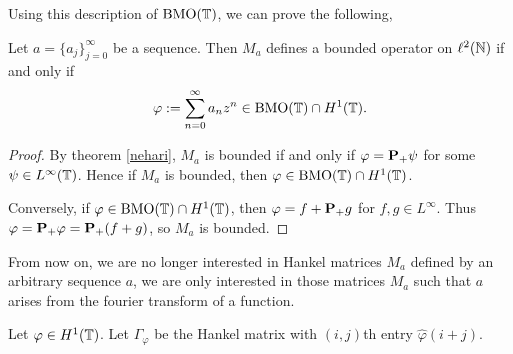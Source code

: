 \documentclass{unswmaths}
\begin{document}
Using this description of $\operatorname{BMO}(\mathbb{T})$, we can prove the following,
\begin{corollary}
    Let $a = \{a_j\}_{j=0}^\infty$ be a sequence. Then $M_a$ defines
    a bounded operator on $\ell^2(\mathbb{N})$ if and only if
    \begin{equation*}
        \varphi := \sum_{n=0}^\infty a_n z^n \in \operatorname{BMO}(\mathbb{T})\cap H^1(\mathbb{T}).
    \end{equation*}
\end{corollary}
\begin{proof}
    By theorem \ref{nehari}, $M_a$ is bounded if and only if $\varphi = \mathbf{P}_+\psi$
    for some $\psi \in L^\infty(\mathbb{T})$. Hence if $M_a$ is bounded,
    then $\varphi \in \operatorname{BMO}(\mathbb{T})\cap H^1(\mathbb{T})$. 
    
    Conversely, if $\varphi \in \operatorname{BMO}(\mathbb{T})\cap H^1(\mathbb{T})$,
    then $\varphi = f+\mathbf{P}_+g$ for $f,g \in L^\infty$. Thus
    $\varphi = \mathbf{P}_+\varphi = \mathbf{P}_+(f+g)$, so $M_a$ is bounded.
\end{proof}

From now on, we are no longer interested in Hankel matrices $M_a$ defined by an arbitrary
sequence $a$, we are only interested in those matrices $M_a$ such that $a$
arises from the fourier transform of a function. 
\begin{definition}
    Let $\varphi \in H^1(\mathbb{T})$. Let $\Gamma_\varphi$
    be the Hankel matrix with $(i,j)$th entry $\hat{\varphi}(i+j)$.
\end{definition}
\end{document}
